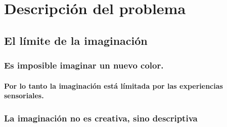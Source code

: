 \chapter{Descripción del problema}
\section{El límite de la imaginación}
\subsection{Es imposible imaginar un nuevo color.}
\subsubsection{Por lo tanto la imaginación está límitada por las experiencias sensoriales.}
\subsection{La imaginación no es creativa, sino descriptiva}